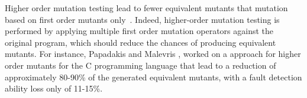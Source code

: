 Higher order mutation testing lead to fewer equivalent mutants that mutation based on first order mutants only~\cite{jia2009higher,kintis2010evaluating,offutt1992investigations,papadakis2010empirical}. Indeed, higher-order mutation testing is performed by applying multiple first order mutation operators against the original program, 
which should reduce the chances of producing equivalent mutants. 
For instance, Papadakis and Malevris \cite{papadakis2010empirical}, worked on a approach for higher order mutants for the C programming language that lead to a reduction of approximately 80-90\% of the generated equivalent mutants, with a fault detection ability loss only of 11-15\%. 

\endinput



